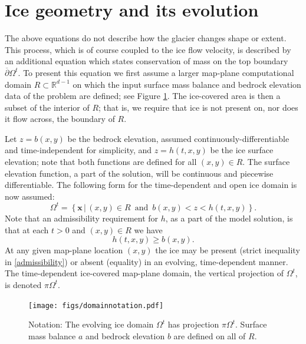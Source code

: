 \documentclass[letterpaper,final,12pt,reqno]{amsart}
\newcommand{\RR}{\mathbb{R}}
\newcommand{\bx}{\mathbf{x}}
\begin{document}
\section{Ice geometry and its evolution} \label{sec:stronggeometry}

The above equations do not describe how the glacier changes shape or extent.  This process, which is of course coupled to the ice flow velocity, is described by an additional equation which states conservation of mass on the top boundary $\overline{\partial} \Omega^t$.  To present this equation we first assume a larger map-plane computational domain $R\subset \RR^{d-1}$ on which the input surface mass balance and bedrock elevation data of the problem are defined; see Figure \ref{fig:domainnotation}.  The ice-covered area is then a subset of the interior of $R$; that is, we require that ice is not present on, nor does it flow across, the boundary of $R$.

Let $z=b(x,y)$ be the bedrock elevation, assumed continuously-differentiable and time-independent for simplicity, and $z=h(t,x,y)$ be the ice surface elevation; note that both functions are defined for all $(x,y)\in R$.  The surface elevation function, a part of the solution, will be continuous and piecewise differentiable.  The following form for the time-dependent and open ice domain is now assumed:
\begin{equation}
\Omega^t = \left\{\bx\,\big|\,(x,y)\in R \,\text{ and }\, b(x,y) < z < h(t,x,y)\right\}.  \label{Omegat}
\end{equation}
Note that an admissibility requirement \cite{Bueler2016} for $h$, as a part of the model solution, is that at each $t>0$ and $(x,y)\in R$ we have
\begin{equation}
h(t,x,y) \ge b(x,y).  \label{admissibility}
\end{equation}
At any given map-plane location $(x,y)$ the ice may be present (strict inequality in \eqref{admissibility}) or absent (equality) in an evolving, time-dependent manner.  The time-dependent ice-covered map-plane domain, the vertical projection of $\Omega^t$, is denoted $\pi \Omega^t$.

\begin{figure}[ht]
\begin{center}
\texttt{[image: figs/domainnotation.pdf]}
\end{center}
\caption{Notation: The evolving ice domain $\Omega^t$ has projection $\pi \Omega^t$.  Surface mass balance $a$ and bedrock elevation $b$ are defined on all of $R$.}
\label{fig:domainnotation}
\end{figure}
\end{document}
